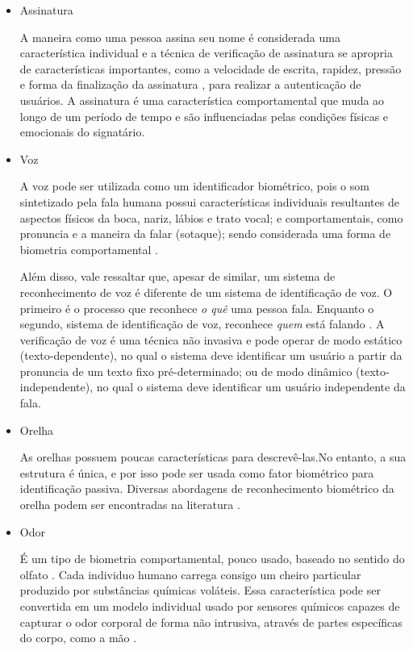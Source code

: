 \begin{itemize}
\item Assinatura

  A maneira como uma pessoa assina seu nome é considerada uma característica individual \cite{maltoni2009handbook} e a técnica de verificação de assinatura se apropria de características importantes, como a velocidade de escrita, rapidez, pressão e forma da finalização da assinatura \cite{liu2001practical}, para realizar a autenticação de usuários. A assinatura é uma característica comportamental que muda ao longo de um período de tempo e são influenciadas pelas condições físicas e emocionais do signatário.


\item Voz

  A voz pode ser utilizada como um identificador biométrico, pois o som sintetizado pela fala humana possui características individuais resultantes de aspectos físicos da boca, nariz, lábios e trato vocal; e comportamentais, como pronuncia e a maneira da falar (sotaque); sendo considerada uma forma de biometria comportamental \cite{clarke2011transparent}. 

  Além disso, vale ressaltar que, apesar de similar, um sistema de reconhecimento de voz é diferente de um sistema de identificação de voz. O primeiro é o processo que reconhece \textit{o quê} uma pessoa fala. Enquanto o segundo, sistema de identificação de voz, reconhece \textit{quem} está falando \cite{clarke2011transparent}. A verificação de voz é uma técnica não invasiva e pode operar de modo estático (texto-dependente), no qual o sistema deve identificar um usuário a partir da pronuncia de um texto fixo pré-determinado; ou de modo dinâmico (texto-independente), no qual o sistema deve identificar um usuário independente da fala.


\item Orelha
    
  As orelhas possuem poucas características para descrevê-las.No entanto, a sua estrutura é única, e por isso pode ser usada como fator biométrico para identificação passiva. Diversas abordagens de reconhecimento biométrico da orelha podem ser encontradas na literatura \cite{reconhecimentoorelha, pflug2012ear, yan2006automatic, yuan2007ear, zhang2005novel, chang2003comparison}.

\item Odor

  É um tipo de biometria comportamental, pouco usado, baseado no sentido do olfato \cite{revett2008behavioral}. Cada individuo humano carrega consigo um cheiro particular produzido por substâncias químicas voláteis. Essa característica pode ser convertida em um modelo individual usado por sensores químicos capazes de capturar o odor corporal de forma não intrusiva, através de partes específicas do corpo, como a mão \cite{vacca2007biometric}.



\end{itemize}


